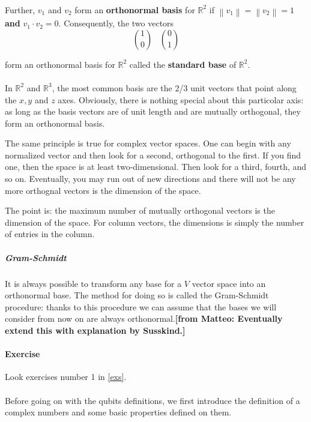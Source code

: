 \documentclass[a4paper,10pt]{article}
\newcommand{\from}[2]{{\bf[{\sc from #1:} #2]}}
\newcommand\norm[1]{\left\lVert#1\right\rVert}
\begin{document}
\paragraph{} Further, $v_1$ and $v_2$ form an \textbf{orthonormal basis} for ${\mathbb{R}}^2$ if $\norm{v_1} = \norm{v_2} = 1$ \textbf{and} $v_1 \cdot v_2 = 0$.
Consequently, the two vectors
\begin{equation}
\binom{1}{0} \; \; \; \binom{0}{1}
\label{eq:standardBaseInR2}
\end{equation}

form an orthonormal basis for ${\mathbb{R}}^2$ called the \textbf{standard base} of ${\mathbb{R}}^2$.

\paragraph{} In ${\mathbb{R}}^2$ and ${\mathbb{R}}^3$, the most common basis are the 2/3 unit vectors that point along the $x, y$ and $z$ axes. Obviously, there is nothing special about this particolar axis: as long as the basis vectors are of unit length and are mutually orthogonal, they form an orthonormal basis.

The same principle is true for complex vector spaces. One can begin with any normalized vector and then look for a second, orthogonal to the first. If you find one, then the space is at least two-dimensional. Then look for a third, fourth, and so on. Eventually, you may run out of new directions and there will not be any more orthognal vectors is the dimension of the space.

The point is: the maximum number of mutually orthogonal vectors is the dimension of the space. For column vectors, the dimensions is simply the number of entries in the column.

\subparagraph{Gram-Schmidt}
\label{subpar:gramschmidt}
It is always possible to transform any base for a $V$ vector space into an orthonormal base. The method for doing so is called the Gram-Schmidt procedure: thanks to this procedure we can assume that the bases we will consider from now on are always orthonormal.\from{Matteo}{Eventually extend this with explanation by Susskind.}

\paragraph{Exercise} Look exercises number 1 in \autoref{exs}.

\paragraph{} Before going on with the qubits definitions, we first introduce the definition of a complex numbers and some basic properties defined on them.
\end{document}

